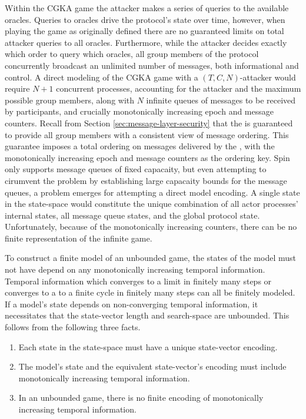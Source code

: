 Within the CGKA game the attacker makes a series of queries to the available oracles.
Queries to oracles drive the  protocol's state over time, however, when playing the game as originally defined there are no guaranteed limits on total attacker queries to all oracles.
Furthermore, while the attacker decides exactly which order to query which oracles, all group members of the  protocol concurrently broadcast an unlimited number of messages, both informational and control.
A direct modeling of the CGKA game with a \((T, C, N)\)-attacker would require \(N+1\) concurrent processes, accounting for the attacker and the maximum possible group members, along with \(N\) infinite queues of messages to be received by participants, and crucially monotonically increasing epoch and message counters.
Recall from Section \ref{sec:message-layer-security} that the  is guaranteed to provide all group members with a consistent view of message ordering.
This guarantee imposes a total ordering on messages delivered by the , with the monotonically increasing epoch and message counters as the ordering key.
Spin only supports message queues of fixed capacaity, but even attempting to cirumvent the problem by establishing large capacaity bounds for the message queues, a problem emerges for attempting a direct model encoding.
A single state in the state-space would constitute the unique combination of all actor processes' internal states, all message queue states, and the global protocol state.
Unfortunately, because of the monotonically increasing counters, there can be no finite representation of the infinite game.

To construct a finite model of an unbounded game, the states of the model must not have depend on any monotonically increasing temporal information.
Temporal information which converges to a limit in finitely many steps or converges to a to a finite cycle in finitely many steps can all be finitely modeled.
If a model's state depends on non-converging temporal information, it necessitates that the state-vector length and search-space are unbounded.
This follows from the following three facts.

\begin{enumerate}
\def\labelenumi{\arabic{enumi}.}
\item Each state in the state-space must have a unique state-vector encoding.
\item The model's state and the equivalent state-vector's encoding must include monotonically increasing temporal information.
\item In an unbounded game, there is no finite encoding of monotonically increasing temporal information.
\end{enumerate}

